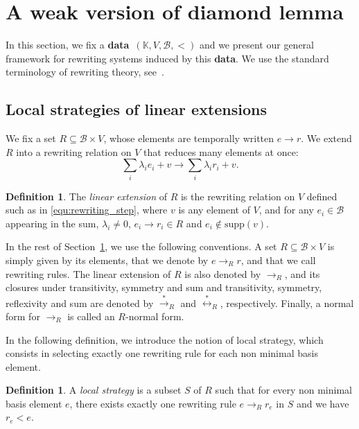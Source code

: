 \documentclass[10pt]{easychair}
\theoremstyle{definition}
\newtheorem{definition}[theorem]{Definition}
\newcommand\data{{\color{red}\bf data}}
\newcommand\supp{\text{supp}}
\newcommand\basis{\mathscr{B}}
\newcommand\K{\mathbb{K}}
\newcommand\rewR{\to_R}
\newcommand\transR{\overset{*}{\to}_R}
\newcommand\equivR{\overset{*}{\leftrightarrow}_R}
\begin{document}
\section{A weak version of diamond lemma}
\label{sec:a_weak_version_of_diamond_lemma}

In this section, we fix a \data\ $(\K,V,\basis,<)$ and we present our 
general framework for rewriting systems induced by this \data. We use the
standard terminology of rewriting theory, see~\cite{MR1629216}.

\subsection{Local strategies of linear extensions}
\label{sec:local_strategies_of_linear_extensions}

We fix a set $R\subseteq\basis\times V$, whose elements are temporally
written $e\to r$. We extend $R$ into a rewriting relation on $V$ that
reduces many elements at once:
\begin{equation}\label{equ:rewriting_step}
  \sum_i\lambda_ie_i+v\to\sum_i\lambda_ir_i+v.
\end{equation}

\begin{definition}\label{def:extensions}
  The {\em linear extension} of $R$ is the rewriting relation on $V$
  defined such as in \eqref{equ:rewriting_step}, where $v$ is any element
  of $V$, and for any $e_i\in\basis$ appearing in the sum,
  $\lambda_i\neq 0$, $e_i\to r_i\in R$ and $e_i\notin\supp(v)$. 
\end{definition}
\smallskip

In the rest of Section~\ref{sec:a_weak_version_of_diamond_lemma}, we use the
following conventions. A set $R\subseteq\basis\times V$ is simply given
by its elements, that we denote by $e\rewR r$, and that we call rewriting
rules. The linear extension of $R$ is also denoted by $\rewR$, and its
closures under transitivity, symmetry and sum and transitivity, symmetry,
reflexivity and sum are denoted by $\transR$ and $\equivR$, respectively.
Finally, a normal form for $\rewR$ is called an $R$-normal form.
\medskip

In the following definition, we introduce the notion of local strategy,
which consists in selecting exactly one rewriting rule for each non
minimal basis element.

\begin{definition}
  A \emph{local strategy} is a subset $S$ of $R$ such that for every non
  minimal basis element $e$, there exists exactly one rewriting rule
  $e\rewR r_e$ in $S$ and we have $r_e<e$. 
\end{definition}
\smallskip
\end{document}
